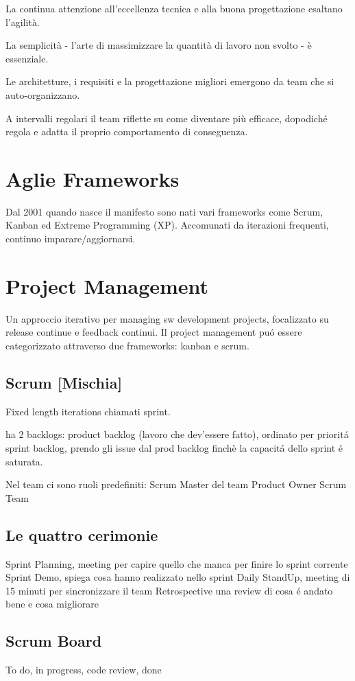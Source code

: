 \begin{itemize}
La continua attenzione all'eccellenza tecnica
e alla buona progettazione esaltano l'agilità.

La semplicità - l'arte di massimizzare la quantità
di lavoro non svolto - è essenziale.

Le architetture, i requisiti e la progettazione
migliori emergono da team che si auto-organizzano.

A intervalli regolari il team riflette su come
diventare più efficace, dopodiché regola e adatta
il proprio comportamento di conseguenza. 

\section{Aglie Frameworks}
Dal 2001 quando nasce il manifesto sono nati vari frameworks come Scrum, 
Kanban ed Extreme Programming (XP). Accomunati da iterazioni frequenti,
continuo imparare/aggiornarsi. 

\section{Project Management}
Un approccio iterativo per managing sw development projects, focalizzato 
su release continue e feedback continui. Il project management pu\'o essere 
categorizzato attraverso due frameworks: kanban e scrum.

\subsection{Scrum [Mischia]}
Fixed length iterations chiamati sprint.

ha 2 backlogs: 
	product backlog (lavoro che dev'essere fatto), ordinato per priorit\'a 
	sprint backlog, prendo gli issue dal prod backlog finchè la capacit\'a dello 
	sprint \'e saturata.

Nel team ci sono ruoli predefiniti:
	Scrum Master del team 
	Product Owner
	Scrum Team 

\subsection{Le quattro cerimonie}
Sprint Planning, meeting per capire quello che manca per finire lo sprint corrente
Sprint Demo, spiega cosa hanno realizzato nello sprint 
Daily StandUp, meeting di 15 minuti per sincronizzare il team 
Retrospective una review di cosa \'e andato bene e cosa migliorare

\subsection{Scrum Board}
To do, in progress, code review, done


\end{itemize}
